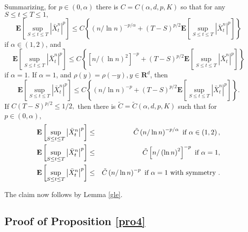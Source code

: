 \documentclass[11pt]{amsart}
\theoremstyle{plain}
\numberwithin{equation}{section}
\begin{document}
Summarizing, for $p\in \left( 0,\alpha \right) $ there is $C=C\left(
\alpha,d ,p,K\right) $ so that for any $S\leq t\leq T\leq 1,$\begin{equation*}
\mathbf{E}\left[ \sup_{S\leq t\leq T}\left\vert \bar{X}_{t}^{n}\right\vert
^{p}\right] \leq C\left\{ \left( n/\ln n\right) ^{-p/\alpha }+\left(
T-S\right) ^{p/2}\mathbf{E}\left[ \sup_{S\leq t\leq T}\left\vert \bar{X}_{t}^{n}\right\vert ^{p}\right] \right\}
\end{equation*}if $\alpha \in \left( 1,2\right) $, and\begin{equation*}
\mathbf{E}\left[ \sup_{S\leq t\leq T}\left\vert \bar{X}_{t}^{n}\right\vert
^{p}\right] \leq C\left\{ \left[ n/\left( \ln n\right) ^{2}\right]
^{-p}+\left( T-S\right) ^{p/2}\mathbf{E}\left[ \sup_{S\leq t\leq
T}\left\vert \bar{X}_{t}^{n}\right\vert ^{p}\right] \right\}
\end{equation*}if $\alpha =1$. If $\alpha =1$, and $\rho \left( y\right) =\rho \left(
-y\right) ,y\in \mathbf{R}^{d}$, then 
\begin{equation*}
\mathbf{E}\left[ \sup_{S\leq t\leq T}\left\vert \bar{X}_{t}^{n}\right\vert
^{p}\right] \leq C\left\{ \left( n/\ln n\right) ^{-p}+\left( T-S\right)
^{p/2}\mathbf{E}\left[ \sup_{S\leq t\leq T}\left\vert \bar{X}_{t}^{n}\right\vert ^{p}\right] \right\} .
\end{equation*}If $C\left( T-S\right) ^{p/2}\leq 1/2,$ then there is $\tilde{C}=\tilde{C}\left( \alpha,d ,p,K\right) $ such that for $p\in \left( 0,\alpha \right)$, 
\begin{eqnarray}
\mathbf{E}\left[ \sup_{S\leq t\leq T}\left\vert \bar{X}_{t}^{n}\right\vert
^{p}\right] &\leq &\tilde{C}\left( n/\ln n\right) ^{-p/\alpha }\text{ if }\alpha \in \left( 1,2\right) ,  \notag \\
\mathbf{E}\left[ \sup_{S\leq t\leq T}\left\vert \bar{X}_{t}^{n}\right\vert
^{p}\right] &\leq &\tilde{C}\left[ n/\left( \ln n\right) ^{2}\right] ^{-p}\text{ if }\alpha =1,  \label{for3} \\
\mathbf{E}\left[ \sup_{S\leq t\leq T}\left\vert \bar{X}_{t}^{n}\right\vert
^{p}\right] &\leq &\tilde{C}\left( n/\ln n\right) ^{-p}\text{ if }\alpha =1 
\text{ with symmetry }.  \notag
\end{eqnarray}

The claim now follows by Lemma \ref{gle}.

\subsection{Proof of Proposition \protect\ref{pro4}}
\end{document}
